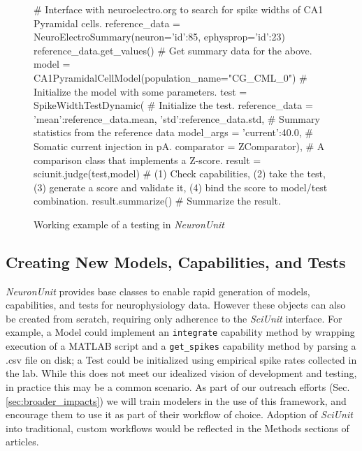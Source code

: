 \documentclass[11pt,letterpaper]{article}
\let\verbx\lstinline
\begin{document}
\begin{figure}
\begin{python}
# Interface with neuroelectro.org to search for spike widths of CA1 Pyramidal cells. 
reference_data = NeuroElectroSummary(neuron={'id':85}, ephysprop={'id':23})
reference_data.get_values()  # Get summary data for the above. 
model = CA1PyramidalCellModel(population_name="CG_CML_0") # Initialize the model with some parameters.
test = SpikeWidthTestDynamic( # Initialize the test.    
	reference_data = {'mean':reference_data.mean, 'std':reference_data.std}, # Summary statistics from the reference data
	model_args = {'current':40.0}, # Somatic current injection in pA.  
	comparator = ZComparator), # A comparison class that implements a Z-score.  
result = sciunit.judge(test,model) # (1) Check capabilities, (2) take the test, (3) generate a score and validate it, (4) bind the score to model/test combination. 
result.summarize() # Summarize the result.  
\end{python}
\caption{Working example of a testing in \textit{NeuronUnit}}
\label{fig:neuronunit_example}
\vspace{-15px}
\end{figure}

\subsection{Creating New Models, Capabilities, and Tests}
\textit{NeuronUnit} provides base classes to enable rapid generation of models, capabilities, and tests for neurophysiology data. 
However these objects can also be created from scratch, requiring only adherence to the \textit{SciUnit} interface. 
For example, a Model could implement an \verbx{integrate} capability method by wrapping execution of a MATLAB script and a \verbx{get_spikes} capability method by parsing a .csv file on disk; 
a Test could be initialized using empirical spike rates collected in the lab.  
While this does not meet our idealized vision of development and testing, in practice this may be a common scenario. 
As part of our outreach efforts (Sec. \ref{sec:broader_impacts}) we will train modelers in the use of this framework, and encourage them to use it as part of their workflow of choice. 
Adoption of \textit{SciUnit} into traditional, custom workflows would be reflected in the Methods sections of articles.  
\end{document}

